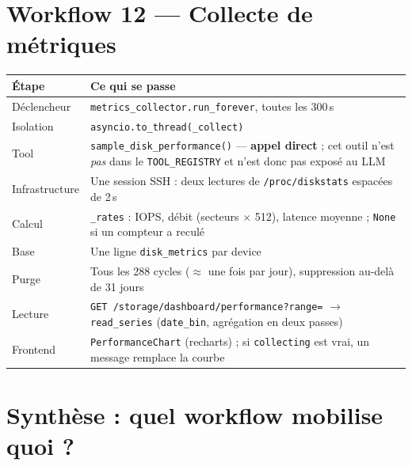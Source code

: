 \documentclass[11pt,a4paper]{report}
\newcommand{\fn}[1]{\texttt{\small\textcolor{oasisviolet}{#1}}}
\newcommand{\cls}[1]{\texttt{\small\textcolor{oasisblue}{#1}}}
\newcommand{\tbl}[1]{\texttt{\small\textcolor{oasisamber}{#1}}}
\newcommand{\route}[1]{\texttt{\small\textcolor{oasisgreen}{#1}}}
\newcommand{\arrowto}{\ensuremath{\rightarrow}}
\begin{document}
\section{Workflow 12 --- Collecte de métriques}

\begin{longtable}{@{}p{2.9cm}p{11.9cm}@{}}
\toprule
\textbf{Étape} & \textbf{Ce qui se passe}\\
\midrule
\endhead
Déclencheur & \fn{metrics\_collector.run\_forever}, toutes les 300\,s\\
Isolation & \fn{asyncio.to\_thread(\_collect)}\\
Tool & \fn{sample\_disk\_performance()} --- \textbf{appel direct} ; cet outil n'est \emph{pas} dans le \fn{TOOL\_REGISTRY} et n'est donc pas exposé au LLM\\
Infrastructure & Une session SSH : deux lectures de \texttt{/proc/diskstats} espacées de 2\,s\\
Calcul & \fn{\_rates} : IOPS, débit (secteurs \(\times\) 512), latence moyenne ; \texttt{None} si un compteur a reculé\\
Base & Une ligne \tbl{disk\_metrics} par device\\
Purge & Tous les 288 cycles (\(\approx\) une fois par jour), suppression au-delà de 31 jours\\
Lecture & \route{GET /storage/dashboard/performance?range=} \arrowto{} \fn{read\_series} (\texttt{date\_bin}, agrégation en deux passes)\\
Frontend & \cls{PerformanceChart} (recharts) ; si \texttt{collecting} est vrai, un message remplace la courbe\\
\bottomrule
\end{longtable}

\section{Synthèse : quel workflow mobilise quoi ?}
\end{document}
